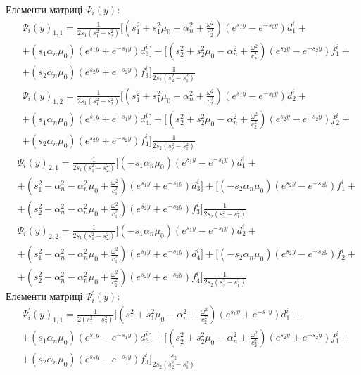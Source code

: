 Елементи матриці $\Psi_i(y)$:
\begin{align*}
    &\Psi_i(y)_{1,1}= \frac{1}{2 s_1 (s_1^2 - s_2^2)} [(s_1^2 + s_1^2 \mu_0 - \alpha_n^2 + \frac{\omega^2}{c_2^2}) (e^{s_1 y} - e^{-s_1 y}) d_1^i + \\
    &+ (s_1 \alpha_n \mu_0) (e^{s_1 y} + e^{-s_1 y}) d_3^i ]
    + [(s_2^2 + s_2^2 \mu_0 - \alpha_n^2 + \frac{\omega^2}{c_2^2}) (e^{s_2 y} - e^{-s_2 y}) f_1^i + \\
    &+ (s_2 \alpha_n \mu_0) (e^{s_2 y} + e^{-s_2 y}) f_3^i ] \frac{1}{2 s_2 (s_2^2 - s_1^2)}
\end{align*}
\begin{align*}
    &\Psi_i(y)_{1,2}= \frac{1}{2 s_1 (s_1^2 - s_2^2)} [(s_1^2 + s_1^2 \mu_0 - \alpha_n^2 + \frac{\omega^2}{c_2^2}) (e^{s_1 y} - e^{-s_1 y}) d_2^i + \\
    &+ (s_1 \alpha_n \mu_0) (e^{s_1 y} + e^{-s_1 y}) d_4^i ]
    + [(s_2^2 + s_2^2 \mu_0 - \alpha_n^2 + \frac{\omega^2}{c_2^2}) (e^{s_2 y} - e^{-s_2 y}) f_2^i + \\
    &+ (s_2 \alpha_n \mu_0) (e^{s_2 y} + e^{-s_2 y}) f_4^i ] \frac{1}{2 s_2 (s_2^2 - s_1^2)}
\end{align*}
\begin{align*}
    &\Psi_i(y)_{2,1}= \frac{1}{2 s_1 (s_1^2 - s_2^2)} [(-s_1 \alpha_n \mu_0) (e^{s_1 y} - e^{-s_1 y}) d_1^i + \\
    &+ (s_1^2 - \alpha_n^2 - \alpha_n^2\mu_0 + \frac{\omega^2}{c_1^2}) (e^{s_1 y} + e^{-s_1 y}) d_3^i ]
    + [(-s_2 \alpha_n \mu_0) (e^{s_2 y} - e^{-s_2 y}) f_1^i + \\
    &+ (s_2^2 - \alpha_n^2 - \alpha_n^2\mu_0 + \frac{\omega^2}{c_1^2}) (e^{s_2 y} + e^{-s_2 y}) f_3^i ] \frac{1}{2 s_2 (s_2^2 - s_1^2)}
\end{align*}
\begin{align*}
    &\Psi_i(y)_{2,2}= \frac{1}{2 s_1 (s_1^2 - s_2^2)} [(-s_1 \alpha_n \mu_0) (e^{s_1 y} - e^{-s_1 y}) d_2^i + \\
    &+ (s_1^2 - \alpha_n^2 - \alpha_n^2\mu_0 + \frac{\omega^2}{c_1^2}) (e^{s_1 y} + e^{-s_1 y}) d_4^i ]
    + [(-s_2 \alpha_n \mu_0) (e^{s_2 y} - e^{-s_2 y}) f_2^i + \\
    &+ (s_2^2 - \alpha_n^2 - \alpha_n^2\mu_0 + \frac{\omega^2}{c_1^2}) (e^{s_2 y} + e^{-s_2 y}) f_4^i ] \frac{1}{2 s_2 (s_2^2 - s_1^2)}
\end{align*}
Елементи матриці $\Psi_i^{'}(y)$:
\begin{align*}
    &\Psi_i^{'}(y)_{1,1}= \frac{1}{2 (s_1^2 - s_2^2)} [(s_1^2 + s_1^2 \mu_0 - \alpha_n^2 + \frac{\omega^2}{c_2^2}) (e^{s_1 y} + e^{-s_1 y}) d_1^i + \\
    &+ (s_1 \alpha_n \mu_0) (e^{s_1 y} - e^{-s_1 y}) d_3^i ]
    + [(s_2^2 + s_2^2 \mu_0 - \alpha_n^2 + \frac{\omega^2}{c_2^2}) (e^{s_2 y} + e^{-s_2 y}) f_1^i + \\
    &+ (s_2 \alpha_n \mu_0) (e^{s_2 y} - e^{-s_2 y}) f_3^i ] \frac{s_2}{2 s_2 (s_2^2 - s_1^2)}
\end{align*}
